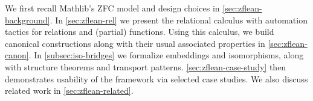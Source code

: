 We first recall Mathlib's ZFC model and design choices in \cref{sec:zflean-background}.
In \cref{sec:zflean-rel} we present the relational calculus with automation tactics for relations and (partial) functions.
Using this calculus, we build canonical constructions along with their usual associated properties in \cref{sec:zflean-canon}.
In \cref{subsec:iso-bridges} we formalize embeddings and isomorphisms, along with structure theorems and transport patterns.
\cref{sec:zflean-case-study} then demonstrates usability of the framework via selected case studies.
We also discuss related work in \cref{sec:zflean-related}.

